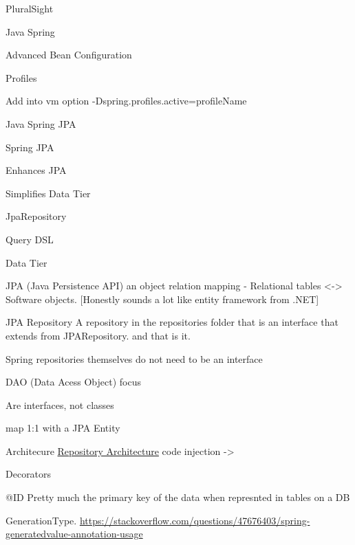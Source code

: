 \documentclass[presentation]{beamer}
\begin{document}
\begin{frame}[label={sec:org34d6546}]{PluralSight}
\begin{block}{Java Spring}
\begin{block}{Advanced Bean Configuration}
\begin{block}{Profiles}
\begin{block}{Add into vm option}
-Dspring.profiles.active=profileName
\end{block}
\end{block}
\end{block}
\end{block}
\begin{block}{Java Spring JPA}
\begin{block}{Spring JPA}
\begin{block}{Enhances JPA}
\end{block}
\begin{block}{Simplifies Data Tier}
\end{block}
\begin{block}{JpaRepository}
\end{block}
\begin{block}{Query DSL}
\end{block}
\begin{block}{Data Tier}
\end{block}
\end{block}
\begin{block}{JPA (Java Persistence API)}
an object relation mapping - Relational tables <-> Software objects.
[Honestly sounds a lot like entity framework from .NET]
\end{block}
\begin{block}{JPA Repository}
A repository in the repositories folder that is an interface that extends from JPARepository. and that is it.
\begin{block}{Spring repositories themselves do not need to be an interface}
\end{block}
\begin{block}{DAO (Data Acess Object) focus}
\end{block}
\begin{block}{Are interfaces, not classes}
\end{block}
\begin{block}{map 1:1 with a JPA Entity}
\end{block}
\end{block}
\begin{block}{Architecure}
\href{./Resources/RepoArchitecture.png}{Repository Architecture}
code injection ->
\end{block}
\begin{block}{Decorators}
\begin{block}{@ID}
Pretty much the primary key of the data when represnted in tables on a DB
\begin{block}{GenerationType.}
\url{https://stackoverflow.com/questions/47676403/spring-generatedvalue-annotation-usage}

\end{block}
\end{block}
\end{block}
\end{block}
\end{frame}
\end{document}
